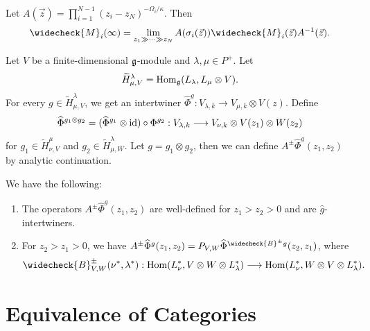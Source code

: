 \begin{lemma}
  Let $A(\vec{z}) = \prod_{i = 1}^{N - 1} (z_i - z_N)^{-\Omega_i / \kappa}$. Then
  \[
    \widecheck{M}_i(\infty)
    = \lim_{z_1 \gg \cdots \gg z_N}
    A(\sigma_i(\vec{z})) \widecheck{M}_i(\vec{z})
    A^{-1}(\vec{z}).
  \]
\end{lemma}

\begin{remark}
  Let $V$ be a finite-dimensional
  $\mathfrak{g}$-module and
  $\lambda, \mu \in P^+$. Let
  \[
    \widetilde{H}^{\lambda}_{\mu, V}
    = \operatorname{Hom}_{\mathfrak{g}}(L_\lambda, L_\mu \otimes V).
  \]
  For every
  $g \in \widetilde{H}^\lambda_{\mu, V}$,
  we get an intertwiner
  $\widehat{\Phi}^g : V_{\lambda, k} \to V_{\mu, k} \otimes V(z)$.
  Define
  \[
    \widehat{\Phi}^{g_1 \otimes g_2}
    = (\widehat{\Phi}^{g_1} \otimes {\operatorname{id}})
    \circ \Phi^{g_2}
    : V_{\lambda, k}
    \longrightarrow
    V_{\nu, k} \otimes V(z_1) \otimes W(z_2)
  \]
  for $g_1 \in \widetilde{H}^\mu_{\nu, V}$ and
  $g_2 \in \widetilde{H}^\lambda_{\mu, W}$.
  Let $g = g_1 \otimes g_2$, then we can
  define $A^{\pm} \widehat{\Phi}^g(z_1, z_2)$
  by analytic continuation.
\end{remark}

\begin{theorem}
  We have the following:
  \begin{enumerate}
    \item The operators
      $A^{\pm} \widehat{\Phi}^g(z_1, z_2)$
      are well-defined for
      $z_1 > z_2 > 0$ and are
      $\widehat{g}$-intertwiners.
    \item For $z_2 > z_1 > 0$,
      we have $A^{\pm} \widehat{\Phi}^g(z_1, z_2) = P_{V, W} \widehat{\Phi}^{\widecheck{B}^{\pm} g}(z_2, z_1)$, where
      \[
        \widecheck{B}^{\pm}_{V, W}(\nu^*, \lambda^*)
        : \Hom(L_\nu^*, V \otimes W \otimes L_\lambda^*)
        \longrightarrow
        \Hom(L_\nu^*, W \otimes V \otimes L_\lambda^*).
      \]
  \end{enumerate}
\end{theorem}

\section{Equivalence of Categories}


